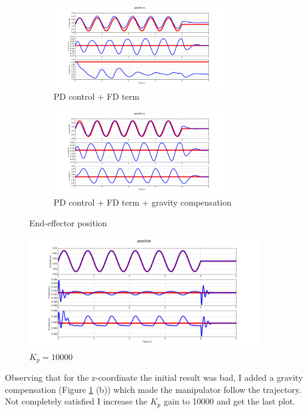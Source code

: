 \documentclass[11pt,a4paper]{article}
\begin{document}
\begin{figure}[H]
	\begin{subfigure}[b]{0.5\textwidth}
		\centering
		\includegraphics[width=75mm]{images/sineh.JPEG}
		\caption{PD control + FD term}
	\end{subfigure}
	\begin{subfigure}[b]{0.5\textwidth}
		\centering
		\includegraphics[width=75mm]{images/sine_g.JPEG}
		\caption{PD control + FD term + gravity compensation}
	\end{subfigure}
	\caption{End-effector position}
	\label{controller}
\end{figure}

\begin{figure}[H]
	\centering
	\includegraphics[width=100mm]{images/sine_kp.JPEG}
	\caption{$K_p=10000$}
	\label{plot3}
\end{figure}

Observing that for the z-coordinate the initial result was bad, I added a gravity compensation (Figure \ref{controller} (b)) which made the manipulator follow the trajectory. Not completely satisfied I increase the $K_p$ gain to 10000 and get the last plot.

 
\footnotesize
\newpage
\hypersetup{linkcolor = black}
\listoffigures
\end{document}
